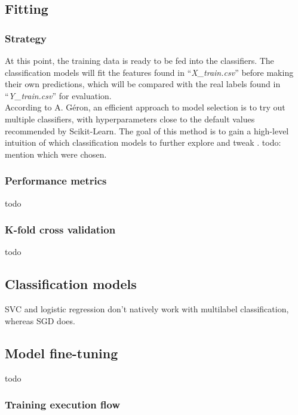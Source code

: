 \documentclass[letterpaper,12pt]{article}
\begin{document}

\subsection{Fitting}

\subsubsection{Strategy}

At this point, the training data is ready to be fed into the classifiers. The classification models will fit the features found in ``\textit{X\_train.csv}'' before making their own predictions, which will be compared with the real labels found in ``\textit{Y\_train.csv}'' for evaluation.\\

According to A. Géron, an efficient approach to model selection is to try out multiple classifiers, with hyperparameters close to the default values recommended by Scikit-Learn. The goal of this method is to gain a high-level intuition of which classification models to further explore and tweak \cite{Geron2019}. todo: mention which were chosen.



\subsubsection{Performance metrics}

todo

\subsubsection{K-fold cross validation}

todo

\subsection{Classification models}

SVC and logistic regression  don't natively work with multilabel classification, whereas SGD does.

\subsection{Model fine-tuning}

todo

\subsubsection{Training  execution flow}
\end{document}
